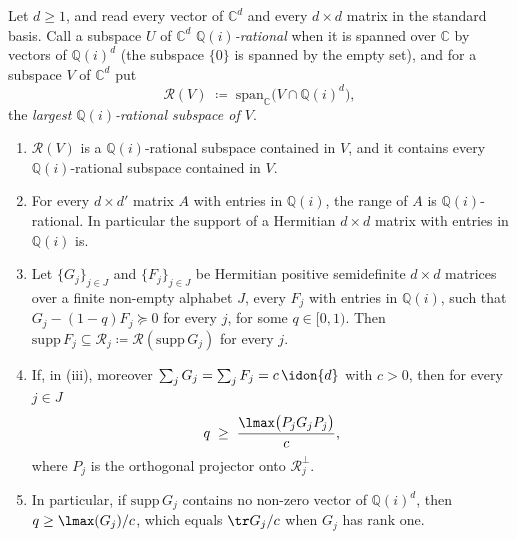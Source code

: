 \begin{lemma}\label{lem:rational-obstruction}
Let $d\ge1$, and read every vector of $\mathbb{C}^{d}$ and every
$d\times d$ matrix in the standard basis. Call a subspace $U$ of
$\mathbb{C}^{d}$ \emph{$\mathbb{Q}(i)$-rational} when it is spanned over
$\mathbb{C}$ by vectors of $\mathbb{Q}(i)^{d}$ (the subspace $\{0\}$ is
spanned by the empty set), and for a subspace $V$ of $\mathbb{C}^{d}$ put
\begin{equation}\label{eq:rational-part}
  \mathcal{R}(V)\;\coloneqq\;\mathrm{span}_{\mathbb{C}}\big(V\cap\mathbb{Q}(i)^{d}\big),
\end{equation}
the \emph{largest $\mathbb{Q}(i)$-rational subspace of $V$}.
\begin{enumerate}[label=(\roman*),leftmargin=2.4em]
\item $\mathcal{R}(V)$ is a $\mathbb{Q}(i)$-rational subspace contained in
  $V$, and it contains every $\mathbb{Q}(i)$-rational subspace contained in
  $V$.
\item For every $d\times d'$ matrix $A$ with entries in $\mathbb{Q}(i)$, the
  range of $A$ is $\mathbb{Q}(i)$-rational. In particular the support of a
  Hermitian $d\times d$ matrix with entries in $\mathbb{Q}(i)$ is.
\item Let $\{G_j\}_{j\in J}$ and $\{F_j\}_{j\in J}$ be Hermitian positive
  semidefinite $d\times d$ matrices over a finite non-empty alphabet $J$,
  every $F_j$ with entries in $\mathbb{Q}(i)$, such that
  $G_j-(1-q)F_j\succeq0$ for every $j$, for some $q\in[0,1)$. Then
  $\mathrm{supp}\,F_j\subseteq\mathcal{R}_j\coloneqq
  \mathcal{R}(\mathrm{supp}\,G_j)$ for every $j$.
\item If, in (iii), moreover $\sum_jG_j=\sum_jF_j=c\,\idon{d}$ with $c>0$,
  then for every $j\in J$
  \begin{equation}\label{eq:rational-bound}
    q\;\ge\;\frac{\lmax\big(P_jG_jP_j\big)}{c},
  \end{equation}
  where $P_j$ is the orthogonal projector onto $\mathcal{R}_j^{\perp}$.
\item In particular, if $\mathrm{supp}\,G_j$ contains no non-zero vector of
  $\mathbb{Q}(i)^{d}$, then $q\ge\lmax(G_j)/c$, which equals $\tr G_j/c$
  when $G_j$ has rank one.
\end{enumerate}
\end{lemma}

